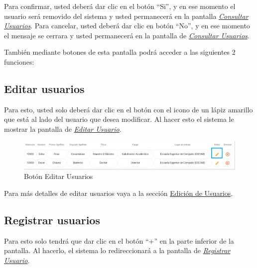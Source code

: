\begin{enumerate}
\begin{figure}[!hbtp]
                \end{figure}
            
                Para confirmar, usted deberá dar clic en el botón “Si”, y en ese momento el usuario será removido del sistema y usted permanecerá en la pantalla \hyperlink{consultarUs}{\textit{Consultar Usuarios}}.
                Para cancelar, usted deberá dar clic en botón “No”, y en ese momento el mensaje se cerrara y usted permanecerá en la pantalla de \hyperlink{consultarUs}{\textit{Consultar Usuarios}}.
        
        \end{enumerate}

        También mediante botones de esta pantalla podrá acceder a las siguientes 2 funciones:

        \subsection{Editar usuarios}

            Para esto, usted solo deberá dar clic en el botón con el icono de un lápiz amarillo que está al lado del usuario que desea modificar. Al hacer esto el sistema le mostrar la pantalla   de \hyperlink{editarUs}{\textit{Editar Usuario}}.
            
            \begin{figure}[!hbtp]
                \centering
                \hypertarget{editar}{\includegraphics[width=0.7\linewidth]{images/SP5/BtnEditar}}
                \caption{Botón Editar Usuarios}
                \label{editar}
            \end{figure}
            
            Para más detalles de editar usuarios vaya a la sección \hyperref[editar-user]{Edición de Usuarios}.
        
        \subsection{Registrar  usuarios}

            Para esto solo tendrá que dar clic en el botón “+” en la parte inferior de la pantalla. Al hacerlo, el sistema  lo redireccionará a la pantalla de \hyperlink{registrarUs}{\textit{Registrar Usuario}}.
        
